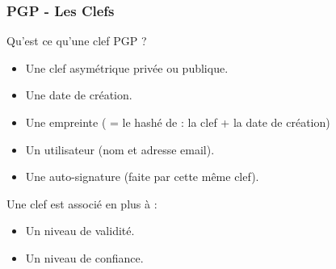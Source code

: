 \begin{frame}
    \frametitle{\color{white}PGP - Les Clefs}
    \begin{block}{Qu'est ce qu'une clef PGP ?}
    	\begin{itemize}
	  \item Une clef asymétrique privée ou publique.
	  \item Une date de création.
	  \item Une empreinte ( = le hashé de : la clef + la date de création)
	  \item Un utilisateur (nom et adresse email).
	  \item Une auto-signature (faite par cette même clef).
       \end{itemize} 
    \end{block}
    \begin{block}{Une clef est associé en plus à :}
      \begin{itemize}
        \item Un niveau de validité.
	\item Un niveau de confiance.
      \end{itemize}
    \end{block}

\end{frame}

